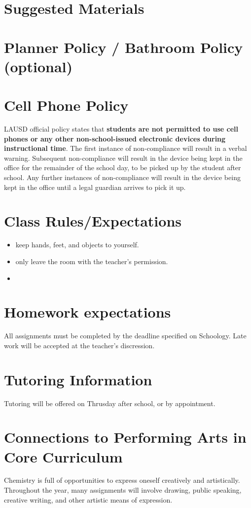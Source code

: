\documentclass[11pt]{article}
\begin{document}
\section{Suggested Materials}
\label{sec:orgec69bce}


\section{Planner Policy / Bathroom Policy (optional)}
\label{sec:orgbd4cbe6}
\section{Cell Phone Policy}
\label{sec:org2b653ac}

LAUSD official policy states that \textbf{\textbf{students are not permitted to use cell phones or any other non-school-issued electronic devices during instructional time}}. The first instance of non-compliance will result in a verbal warning. Subsequent non-compliance will result in  the device being kept in the office for the remainder of the school day, to be picked up by the student after school. Any further instances of non-compliance will result in the device being kept in the office until a legal guardian arrives to pick it up.

\section{Class Rules/Expectations}
\label{sec:org3e42b74}

\begin{itemize}
\item keep hands, feet, and objects to yourself.
\item only leave the room with the teacher's permission.
\item 
\end{itemize}

\section{Homework expectations}
\label{sec:org5ea39fd}
All assignments must be completed by the deadline specified on Schoology. Late work will be accepted at the teacher's discression. 


\section{Tutoring Information}
\label{sec:org8965109}

Tutoring will be offered on Thrusday after school, or by appointment.


\section{Connections to Performing Arts in Core Curriculum}
\label{sec:orgf05ee2c}

Chemistry is full of opportunities to express oneself creatively and artistically. Throughout the year, many assignments will involve drawing, public speaking, creative writing, and other artistic means of expression.
\end{document}
